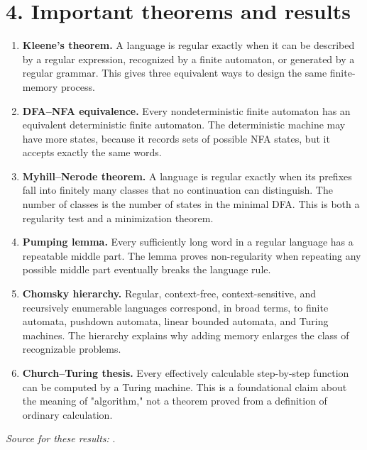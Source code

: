 \section*{4. Important theorems and results}
\begin{enumerate}[leftmargin=*,itemsep=0.35em]

\item \textbf{Kleene's theorem.} A language is regular exactly when it can be described by a regular expression, recognized by a finite automaton, or generated by a regular grammar. This gives three equivalent ways to design the same finite-memory process.

\item \textbf{DFA--NFA equivalence.} Every nondeterministic finite automaton has an equivalent deterministic finite automaton. The deterministic machine may have more states, because it records sets of possible NFA states, but it accepts exactly the same words.

\item \textbf{Myhill--Nerode theorem.} A language is regular exactly when its prefixes fall into finitely many classes that no continuation can distinguish. The number of classes is the number of states in the minimal DFA. This is both a regularity test and a minimization theorem.

\item \textbf{Pumping lemma.} Every sufficiently long word in a regular language has a repeatable middle part. The lemma proves non-regularity when repeating any possible middle part eventually breaks the language rule.

\item \textbf{Chomsky hierarchy.} Regular, context-free, context-sensitive, and recursively enumerable languages correspond, in broad terms, to finite automata, pushdown automata, linear bounded automata, and Turing machines. The hierarchy explains why adding memory enlarges the class of recognizable problems.

\item \textbf{Church--Turing thesis.} Every effectively calculable step-by-step function can be computed by a Turing machine. This is a foundational claim about the meaning of "algorithm," not a theorem proved from a definition of ordinary calculation.
\end{enumerate}
\noindent\emph{Source for these results:} \cite{automata_theory_ref1}.

